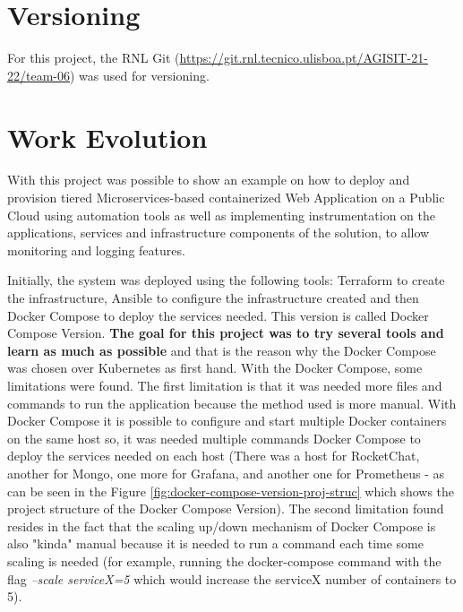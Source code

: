 \documentclass[12pt,a4paper,oneside]{report}
\begin{document}
\cleardoublepage
\chapter{Versioning}
\label{chapter:versioning}
For this project, the RNL Git (\url{https://git.rnl.tecnico.ulisboa.pt/AGISIT-21-22/team-06}) was used for versioning.

\cleardoublepage
\chapter{Work Evolution}
\label{chapter:work-evol}

With this project was possible to show an example on how to deploy and provision tiered Microservices-based containerized Web Application on a Public Cloud using automation tools as well as implementing instrumentation on the applications, services and infrastructure components of the solution, to allow monitoring and logging features. 

Initially, the system was deployed using the following tools: Terraform to create the infrastructure, Ansible to configure the infrastructure created and then Docker Compose to deploy the services needed. This version is called Docker Compose Version. \textbf{The goal for this project was to try several tools and learn as much as possible} and that is the reason why the Docker Compose was chosen over Kubernetes as first hand. With the Docker Compose, some limitations were found. The first limitation is that it was needed more files and commands to run the application because the method used is more manual. With Docker Compose it is possible to configure and start multiple Docker containers on the same host so, it was needed multiple commands Docker Compose to deploy the services needed on each host (There was a host for RocketChat, another for Mongo, one more for Grafana, and another one for Prometheus - as can be seen in the Figure \ref{fig:docker-compose-version-proj-struc} which shows the project structure of the Docker Compose Version). The second limitation found resides in the fact that the scaling up/down mechanism of Docker Compose is also "kinda" manual because it is needed to run a command each time some scaling is needed (for example, running the docker-compose command with the flag \textit{--scale serviceX=5} which would increase the serviceX number of containers to 5). 
\end{document}
